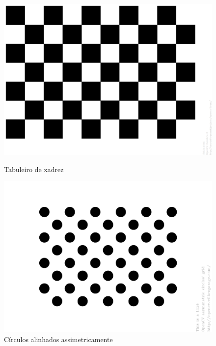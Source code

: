 \begin{figure}[H]
  \includegraphics[width=\linewidth]{Imagens/figura3-3E3-12.png}
  \caption{Tabuleiro de xadrez}\label{fig3:3}
\endminipage\hfill
{}
  \includegraphics[width=\linewidth]{Imagens/figura3-4.png}
  \caption{Círculos alinhados assimetricamente}\label{fig3:4}
\endminipage\hfill
{}

\end{figure}
